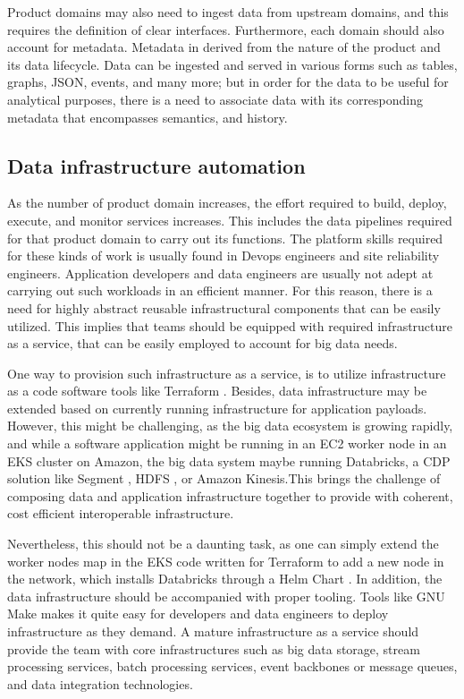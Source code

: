 \documentclass[review]{elsarticle}
\begin{document}
Product domains may also need to ingest data from upstream domains, and this requires the definition of clear interfaces. Furthermore, each domain should also account for metadata. Metadata in derived from the nature of the product and its data lifecycle. Data can be ingested and served in various forms such as tables, graphs, JSON, events, and many more; but in order for the data to be useful for analytical purposes, there is a need to associate data with its corresponding metadata that encompasses semantics, and history. 

\subsection{Data infrastructure automation}

As the number of product domain increases, the effort required to build, deploy, execute, and monitor services increases. This includes the data pipelines required for that product domain to carry out its functions. The platform skills required for these kinds of work is usually found in Devops engineers and site reliability engineers. Application developers and data engineers are usually not adept at carrying out such workloads in an efficient manner. For this reason, there is a need for highly abstract reusable infrastructural components that can be easily utilized. This implies that teams should be equipped with required infrastructure as a service, that can be easily employed to account for big data needs.

One way to provision such infrastructure as a service, is to utilize infrastructure as a code software tools like Terraform \cite{Terraform}. Besides, data infrastructure may be extended based on currently running infrastructure for application payloads. However, this might be challenging, as the big data ecosystem is growing rapidly, and while a software application might be running in an EC2 worker node in an EKS cluster on Amazon, the big data system maybe running Databricks, a CDP solution like Segment \cite{Segment}, HDFS \cite{HDFS}, or Amazon Kinesis.This brings the challenge of composing data and application infrastructure together to provide with coherent, cost efficient interoperable infrastructure.  

Nevertheless, this should not be a daunting task, as one can simply extend the worker nodes map in the EKS code written for Terraform to add a new node in the network, which installs Databricks through a Helm Chart \cite{Helm}. In addition, the data infrastructure should be accompanied with proper tooling. Tools like GNU Make \cite{Make} makes it quite easy for developers and data engineers to deploy infrastructure as they demand. 
A mature infrastructure as a service should provide the team with core infrastructures such as big data storage, stream processing services, batch processing services, event backbones or message queues, and data integration technologies.  
\end{document}
